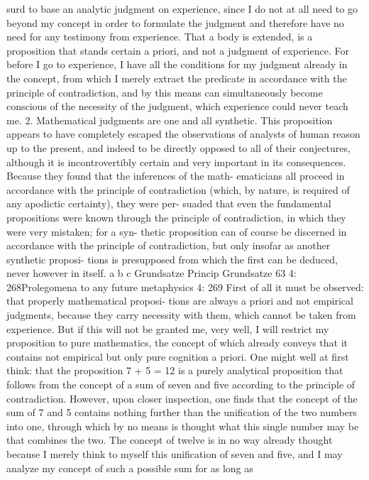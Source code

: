 surd to base an analytic judgment on experience, since I do not at all
need to go beyond my concept in order to formulate the judgment and
therefore have no need for any testimony from experience. That a body is
extended, is a proposition that stands certain a priori, and not a judgment
of experience. For before I go to experience, I have all the conditions
for my judgment already in the concept, from which I merely extract
the predicate in accordance with the principle of contradiction, and by
this means can simultaneously become conscious of the necessity of the
judgment, which experience could never teach me.
2. Mathematical judgments are one and all synthetic. This proposition
appears to have completely escaped the observations of analysts of human
reason up to the present, and indeed to be directly opposed to all of their
conjectures, although it is incontrovertibly certain and very important
in its consequences. Because they found that the inferences of the math-
ematicians all proceed in accordance with the principle of contradiction
(which, by nature, is required of any apodictic certainty), they were per-
suaded that even the fundamental propositions were known through the
principle of contradiction, in which they were very mistaken; for a syn-
thetic proposition can of course be discerned in accordance with the
principle of contradiction, but only insofar as another synthetic proposi-
tions is presupposed from which the ﬁrst can be deduced, never however
in itself.
a
b
c
Grundsatze
Princip
Grundsatze
63
4: 268Prolegomena to any future metaphysics
4: 269
First of all it must be observed: that properly mathematical proposi-
tions are always a priori and not empirical judgments, because they carry
necessity with them, which cannot be taken from experience. But if this
will not be granted me, very well, I will restrict my proposition to pure
mathematics, the concept of which already conveys that it contains not
empirical but only pure cognition a priori.
One might well at ﬁrst think: that the proposition 7 + 5 = 12 is a
purely analytical proposition that follows from the concept of a sum
of seven and ﬁve according to the principle of contradiction. However,
upon closer inspection, one ﬁnds that the concept of the sum of 7 and
5 contains nothing further than the uniﬁcation of the two numbers into
one, through which by no means is thought what this single number may
be that combines the two. The concept of twelve is in no way already
thought because I merely think to myself this uniﬁcation of seven and
ﬁve, and I may analyze my concept of such a possible sum for as long as
